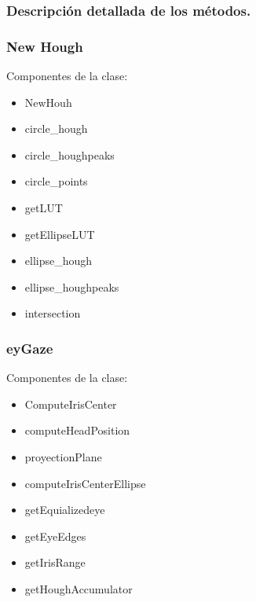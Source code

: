 \documentclass[12pt]{article} %
\begin{document}
		\subsubsection{Descripción detallada de los métodos.}
		        
        \subsubsection{New Hough}
        	Componentes de la clase: \vspace{1cm}
            	\begin{itemize}
                	\item NewHouh
                    \item circle\_hough
                    \item circle\_houghpeaks
                    \item circle\_points
                    \item getLUT
                    \item getEllipseLUT
                    \item ellipse\_hough
                    \item ellipse\_houghpeaks
                    \item intersection
                    
				\end{itemize}

        \subsubsection{eyGaze}
        	Componentes de la clase: 
        	
            \begin{itemize}
				\item ComputeIrisCenter
				\item computeHeadPosition
				\item proyectionPlane
				\item computeIrisCenterEllipse
				\item getEquializedeye
				\item getEyeEdges
				\item getIrisRange
				\item getHoughAccumulator
			\end{itemize}
           
            
\end{document}
